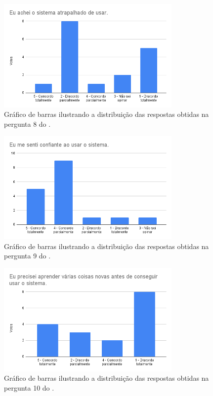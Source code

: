 \documentclass[12pt]{tcc}
\begin{document}
	\begin{figure}[!ht]
		\centering
		\includegraphics[width=0.8\textwidth]{figures/respostas-pergunta-8.png}
		\caption{Gráfico de barras ilustrando a distribuição das respostas obtidas na pergunta 8 do .}
		\label{fig:respostas-pergunta-8}
	\end{figure}

	\begin{figure}[!ht]
		\centering
		\includegraphics[width=0.8\textwidth]{figures/respostas-pergunta-9.png}
		\caption{Gráfico de barras ilustrando a distribuição das respostas obtidas na pergunta 9 do .}
		\label{fig:respostas-pergunta-9}
	\end{figure}

	\begin{figure}[!ht]
		\centering
		\includegraphics[width=0.8\textwidth]{figures/respostas-pergunta-10.png}
		\caption{Gráfico de barras ilustrando a distribuição das respostas obtidas na pergunta 10 do .}
		\label{fig:respostas-pergunta-10}
	\end{figure}
\end{document}
